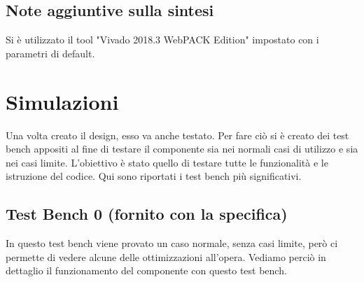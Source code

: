\documentclass{article}
\begin{document}
\subsection{Note aggiuntive sulla sintesi}
Si è utilizzato il tool "Vivado 2018.3 WebPACK Edition" impostato con i parametri di default.


\pagebreak
\section{Simulazioni}
Una volta creato il design, esso va anche testato. Per fare ciò si è creato dei test bench appositi al fine di testare il componente sia nei normali casi di utilizzo e sia nei casi limite. L'obiettivo è stato quello di testare tutte le funzionalità e le istruzione del codice. Qui sono riportati i test bench più significativi.

\subsection{Test Bench 0 (fornito con la specifica)}
In questo test bench viene provato un caso normale, senza casi limite, però ci permette di vedere alcune delle ottimizzazioni all'opera. Vediamo perciò in dettaglio il funzionamento del componente con questo test bench.
\end{document}
